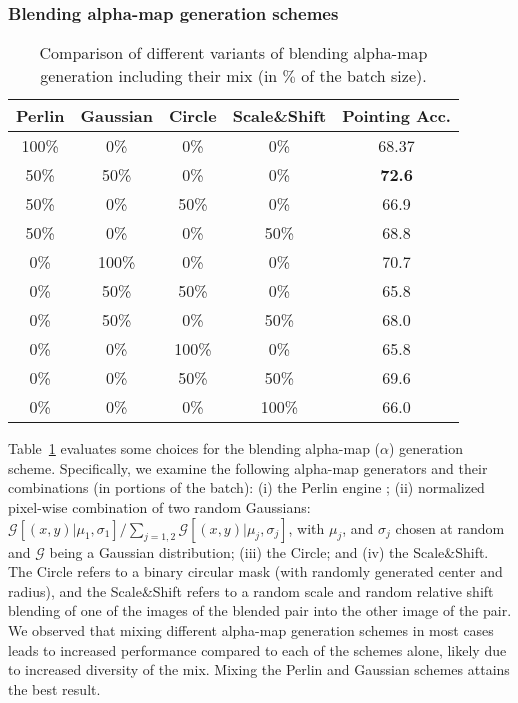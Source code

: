 \documentclass[10pt,twocolumn,letterpaper]{article}
\newcommand\secvspace{\vspace{-0.0cm}}
\newcommand\figvspace{\vspace{-0.2cm}}
\begin{document}
\secvspace
\subsubsection{Blending alpha-map generation schemes}\label{sec:abl_alpha}
\secvspace
\begin{table}[h]
\begin{center}
\begin{tabular}{ ccccc }


 \toprule
 Perlin & Gaussian & Circle & Scale\&Shift & Pointing Acc.\\ 
 \midrule
 100\% & 0\% & 0\% & 0\% & 68.37 \\
 50\% & 50\% & 0\% & 0\% & \textbf{72.6} \\
50\% & 0\%& 50\% & 0\% &  66.9\\
 50\% & 0\%& 0\% & 50\% &  68.8\\
 0\% & 100\% & 0\% & 0\% & 70.7\\
0\%& 50\% & 50\% & 0\% & 65.8\\
 0\% & 50\% & 0\% & 50\% & 68.0\\
0\% & 0\% & 100\% & 0\% & 65.8\\
 0\% & 0\% & 50\% & 50\% & 69.6\\
 0\% & 0\% & 0\% & 100\% & 66.0 \\
\bottomrule
\end{tabular}
\end{center}
\caption{Comparison of different variants of blending alpha-map generation including their mix (in $\%$ of the batch size). 
}
\figvspace
\label{tab:alpha_ablation_supp}
\end{table}
 Table~\ref{tab:alpha_ablation_supp} evaluates some choices for the blending alpha-map ($\alpha$) generation scheme. Specifically, we examine the following alpha-map generators and their combinations (in portions of the batch): (i) the Perlin engine \cite{perlin1985image}; (ii) normalized pixel-wise combination of two random Gaussians: $\mathcal{G}\left[(x,y)|\mu_1,\sigma_1\right] / \sum_{j=1,2}\mathcal{G}\left[(x,y)|\mu_j,\sigma_j\right]$, with $\mu_j$, and $\sigma_j$ chosen at random and $\mathcal{G}$ being a Gaussian distribution; (iii) the Circle; and (iv) the Scale\&Shift. The Circle refers to a binary circular mask (with randomly generated center and radius), and the Scale\&Shift refers to a random scale and random relative shift blending of one of the images of the blended pair into the other image of the pair.
We observed that mixing different alpha-map generation schemes in most cases leads to increased performance compared to each of the schemes alone, likely due to increased diversity of the mix. Mixing the Perlin and Gaussian schemes attains the best result.
\end{document}

